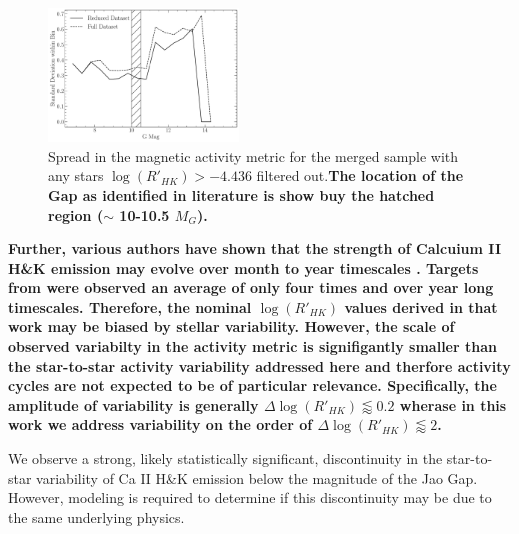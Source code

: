 \begin{figure}
  \centering
  \includegraphics[width=0.45\textwidth]{figures/ReducedDeviation.pdf}
  \caption{Spread in the magnetic activity metric for the merged sample with
  any stars $\log(R'_{HK}) > -4.436$ filtered out.\textbf{The location of the Gap
  as identified in literature is show buy the hatched region ($\sim$ 10-10.5 $M_{G}$).}}
  \label{fig:reduced}
\end{figure}

\textbf{Further, various authors have shown that the strength of Calcuium II
H\&K emission may evolve over month to year timescales
\citep[e.g.][]{Rauscher2006, Perdelwitz2021, Cretignier2024}. Targets from
\citet{Boudreaux2022} were observed an average of only four times and over year
long timescales. Therefore, the nominal $\log(R'_{HK})$ values derived in that
work may be biased by stellar variability. However, the scale of observed
variabilty in the activity metric is signifigantly smaller than the
star-to-star activity variability addressed here and therfore activity cycles
are not expected to be of particular relevance. Specifically, the amplitude of
variability is generally $\Delta \log(R'_{HK}) \lessapprox 0.2$ wherase in this
work we address variability on the order of $\Delta \log(R'_{HK}) \lessapprox 2$.}

We observe a strong, likely statistically significant, discontinuity in the
star-to-star variability of Ca II H\&K emission below the magnitude
of the Jao Gap. However, modeling is required to determine if this discontinuity
may be due to the same underlying physics.

